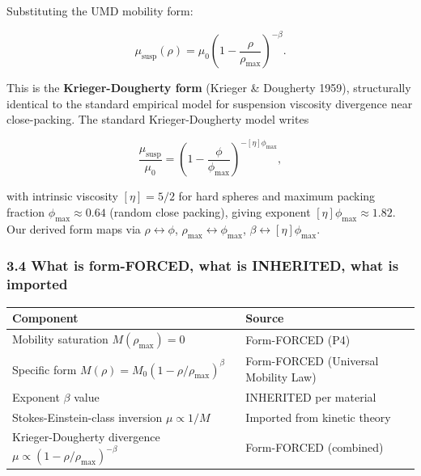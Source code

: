 \documentclass[
  11pt,a4paper]{article}
\newcounter{none} %
\begin{document}
Substituting the UMD mobility form:

\[\boxed{\;\mu_\mathrm{susp}(\rho) = \mu_0 \left(1 - \frac{\rho}{\rho_\mathrm{max}}\right)^{-\beta}.\;}\]

This is the \textbf{Krieger-Dougherty form} (Krieger \& Dougherty 1959),
structurally identical to the standard empirical model for suspension
viscosity divergence near close-packing. The standard Krieger-Dougherty
model writes

\[\frac{\mu_\mathrm{susp}}{\mu_0} = \left(1 - \frac{\phi}{\phi_\mathrm{max}}\right)^{-[\eta]\phi_\mathrm{max}},\]

with intrinsic viscosity \([\eta] = 5/2\) for hard spheres and maximum
packing fraction \(\phi_\mathrm{max} \approx 0.64\) (random close
packing), giving exponent \([\eta]\phi_\mathrm{max} \approx 1.82\). Our
derived form maps via \(\rho \leftrightarrow \phi\),
\(\rho_\mathrm{max} \leftrightarrow \phi_\mathrm{max}\),
\(\beta \leftrightarrow [\eta]\phi_\mathrm{max}\).

\subsubsection{3.4 What is form-FORCED, what is INHERITED, what is
imported}\label{what-is-form-forced-what-is-inherited-what-is-imported}

{\def\LTcaptype{none} %
\begin{longtable}[]{@{}
  >{\raggedright\arraybackslash}p{}
  >{\raggedright\arraybackslash}p{}@{}}
\toprule\noalign{}
\begin{minipage}[b]{\linewidth}\raggedright
Component
\end{minipage} & \begin{minipage}[b]{\linewidth}\raggedright
Source
\end{minipage} \\
\midrule\noalign{}
\endhead
\bottomrule\noalign{}
\endlastfoot
Mobility saturation \(M(\rho_\mathrm{max}) = 0\) & Form-FORCED (P4) \\
Specific form \(M(\rho) = M_0(1-\rho/\rho_\mathrm{max})^\beta\) &
Form-FORCED (Universal Mobility Law) \\
Exponent \(\beta\) value & INHERITED per material \\
Stokes-Einstein-class inversion \(\mu \propto 1/M\) & Imported from
kinetic theory \\
Krieger-Dougherty divergence
\(\mu \propto (1 - \rho/\rho_\mathrm{max})^{-\beta}\) & Form-FORCED
(combined) \\
\end{longtable}
}
\end{document}
